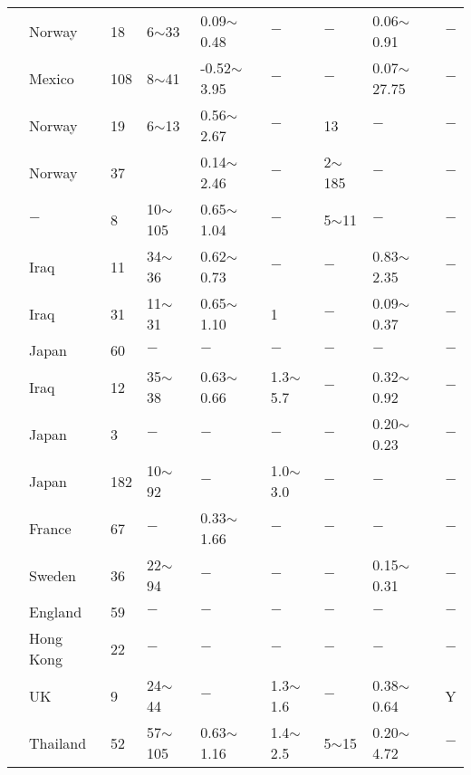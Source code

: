 {\begin{longtable}{lllllllll}
    \citet{Flaate197472} & Norway & 18    & 6$\sim$33  & 0.09$\sim$0.48 & $-$     & $-$     & 0.06$\sim$0.91 & $-$ \\
    \citet{Focht199176} & Mexico & 108   & 8$\sim$41  & -0.52$\sim$3.95 & $-$     & $-$     & 0.07$\sim$27.75 & $-$ \\
    \citet{Gregersen1979535} & Norway & 19    & 6$\sim$13  & 0.56$\sim$2.67 & $-$     & 13    & $-$     & $-$ \\
    \citet{Gregersen1979183} & Norway & 37    &       & 0.14$\sim$2.46 & $-$     & 2$\sim$185 & $-$     & $-$ \\
    \citet{Hansen1980253} & $-$     & 8     & 10$\sim$105 & 0.65$\sim$1.04 & $-$     & 5$\sim$11  & $-$     & $-$ \\
    \citet{Hanzawa197717} & Iraq  & 11    & 34$\sim$36 & 0.62$\sim$0.73 & $-$     & $-$     & 0.83$\sim$2.35 & $-$ \\
    \citet{Hanzawa19771} & Iraq  & 31    & 11$\sim$31 & 0.65$\sim$1.10 & 1     & $-$     & 0.09$\sim$0.37 & $-$ \\
    \citet{Hanzawa197969} & Japan & 60    & $-$     & $-$     & $-$     & $-$     & $-$     & $-$ \\
    \citet{Hanzawa19791} & Iraq  & 12    & 35$\sim$38 & 0.63$\sim$0.66 & 1.3$\sim$5.7 & $-$     & 0.32$\sim$0.92 & $-$ \\
    \citet{Hanzawa1981683} & Japan & 3     & $-$     & $-$     & $-$     & $-$     & 0.20$\sim$0.23 & $-$ \\
    \citet{Hara19741} & Japan & 182   & 10$\sim$92 & $-$     & 1.0$\sim$3.0 & $-$     & $-$     & $-$ \\
    \citet{Harris1995293} & France & 67    & $-$     & 0.33$\sim$1.66 & $-$     & $-$     & $-$     & $-$ \\
    \citet{Helenelund1977} & Sweden & 36    & 22$\sim$94 & $-$     & $-$     & $-$     & 0.15$\sim$0.31 & $-$ \\
    \citet{Henkel1963280} & England & 59    & $-$     & $-$     & $-$     & $-$     & $-$     & $-$ \\
    \citet{Henry1957275} & Hong Kong & 22    & $-$     & $-$     & $-$     & $-$     & $-$     & $-$ \\
    \citet{Hight1992303} & UK    & 9     & 24$\sim$44 & $-$     & 1.3$\sim$1.6 & $-$     & 0.38$\sim$0.64 & Y \\
    \citet{Holmberg19771} & Thailand & 52    & 57$\sim$105 & 0.63$\sim$1.16 & 1.4$\sim$2.5 & 5$\sim$15  & 0.20$\sim$4.72 & $-$ \\

\end{longtable}}
